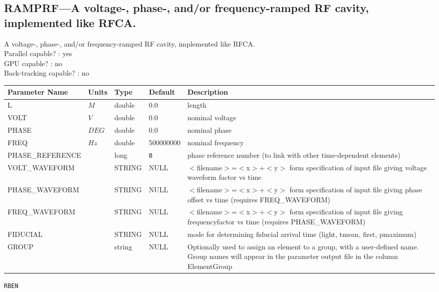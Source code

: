 \subsection{RAMPRF---A voltage-, phase-, and/or frequency-ramped RF cavity, implemented like RFCA.}
A voltage-, phase-, and/or frequency-ramped RF cavity, implemented like RFCA.
\\
Parallel capable? : yes\\
GPU capable? : no\\
Back-tracking capable? : no\\
\begin{tabular}{|l|l|l|l|p{\descwidth}|} \hline
Parameter Name & Units & Type & Default & Description \\ \hline 
L & $M$ & double &  0.0 & length  \\ \hline 
VOLT & $V$ & double &  0.0 & nominal voltage  \\ \hline 
PHASE & $DEG$ & double &  0.0 & nominal phase  \\ \hline 
FREQ & $Hz$ & double &   500000000 & nominal frequency  \\ \hline 
PHASE\_REFERENCE &  & long &  \verb|0| & phase reference number (to link with other time-dependent elements)  \\ \hline 
VOLT\_WAVEFORM &  & STRING &   NULL            & $<$filename$>$=$<$x$>$+$<$y$>$ form specification of input file giving voltage waveform factor vs time  \\ \hline 
PHASE\_WAVEFORM &  & STRING &   NULL            & $<$filename$>$=$<$x$>$+$<$y$>$ form specification of input file giving phase offset vs time (requires FREQ\_WAVEFORM)  \\ \hline 
FREQ\_WAVEFORM &  & STRING &   NULL            & $<$filename$>$=$<$x$>$+$<$y$>$ form specification of input file giving frequencyfactor vs time (requires PHASE\_WAVEFORM)  \\ \hline 
FIDUCIAL &  & STRING &   NULL            & mode for determining fiducial arrival time (light, tmean, first, pmaximum)  \\ \hline 
GROUP &  & string & NULL & Optionally used to assign an element to a group, with a user-defined name.  Group names will appear in the parameter output file in the column ElementGroup  \\ \hline 
\end{tabular}

\vspace*{0.5in}

\newpage
\begin{center}{\Large\verb|RBEN|}\end{center}
